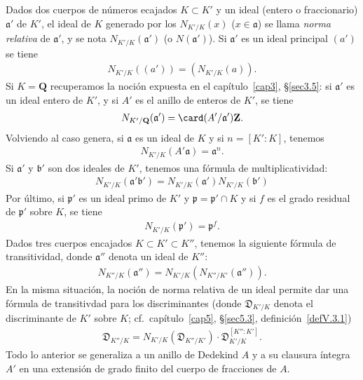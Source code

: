 \documentclass[oneside,bibtotoc,leqno,spanish]{amsbook}
\newcommand{\QQ}{\mathbf{Q}}
\newcommand{\ZZ}{\mathbf{Z}}
\newcommand{\idl}[1]{\mathfrak{#1}}
\newcommand{\disc}{\mathfrak{D}}
\numberwithin{equation}{section}
\theoremstyle{defi}
\theoremstyle{note}
\theoremstyle{rem}
\numberwithin{theorem}{section}
\numberwithin{proposition}{section}
\numberwithin{definition}{section}
\numberwithin{lemma}{section}
\numberwithin{corollary}{section}
\numberwithin{example}{section}
\numberwithin{footnote}{section}%
\begin{document}
Dados dos cuerpos de n\'umeros ecajados $K\subset K'$ y un ideal (entero o fraccionario) $\idl{a}'$ de $K'$,
el ideal de $K$ generado por los $N_{K'/K}(x)$ ($x\in\idl{a}$) se llama {\em norma relativa} de $\idl{a}'$,
y se nota $N_{K'/K}(\idl{a}')$ (o $N(\idl{a}')$). Si $\idl{a}'$ es un ideal principal $(a')$ se tiene
\begin{gather}
N_{K'/K}((a')) = (N_{K'/K}(a)).
\end{gather}
Si $K=\QQ$ recuperamos la noci\'on expuesta en el cap\'itulo~\ref{cap3}, \S\ref{sec3.5}: si $\idl{a}'$ es un
ideal entero de $K'$, y si $A'$ es el anillo de enteros de $K'$, se tiene
\begin{gather}
N_{K'/\QQ}(\idl{a}') = \card(A'/\idl{a}')\ZZ.
\end{gather}
Volviendo al caso genera, si $\idl{a}$ es un ideal de $K$ y si $n=[K':K]$, tenemos
\begin{gather}
N_{K'/K}(A'\idl{a}) = \idl{a}^{n}.
\end{gather}
Si $\idl{a}'$ y $\idl{b}'$ son dos ideales de $K'$, tenemos una f\'ormula de multiplicatividad:
\begin{gather}
N_{K'/K}(\idl{a}'\idl{b}') = N_{K'/K}(\idl{a}')N_{K'/K}(\idl{b}')
\end{gather}
Por \'ultimo, si $\idl{p}'$ es un ideal primo de $K'$ y $\idl{p} = \idl{p}'\cap K$ y si $f$ es el grado
residual de $\idl{p}'$ sobre $K$, se tiene
\begin{gather}
N_{K'/K}(\idl{p}') = \idl{p}^{f}.
\end{gather}
Dados tres cuerpos encajados $K\subset K'\subset K''$, tenemos la siguiente f\'ormula de transitividad, donde
$\idl{a}''$ denota un ideal de $K''$:
\begin{gather}
N_{K''/K}(\idl{a}'') = N_{K'/K}(N_{K''/K'}(\idl{a}'')).
\end{gather}
En la misma situaci\'on, la noci\'on de norma relativa de un ideal permite dar una f\'ormula de transitivdad
para los discriminantes (donde $\disc_{K'/K}$ denota el discriminante de $K'$ sobre $K$;
cf.~cap\'itulo~\ref{cap5}, \S\ref{sec5.3}, definici\'on~\ref{defV.3.1})
\begin{gather}
\disc_{K''/K}=N_{K'/K}(\disc_{K''/K'})\cdot\disc_{K'/K}^{[K'':K']}.
\end{gather}
Todo lo anterior se generaliza a un anillo de Dedekind $A$ y a su clausura \'integra $A'$ en una extensi\'on
de grado finito del cuerpo de fracciones de $A$.

\end{document}
